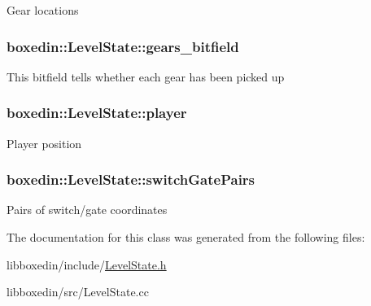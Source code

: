 Gear locations \hypertarget{classboxedin_1_1LevelState_afac5079af12178ae9c5aec7a753e21ad}{
\subsubsection[{gears\+\_\+bitfield}]{ boxedin\+::\+Level\+State\+::gears\+\_\+bitfield}}\label{classboxedin_1_1LevelState_afac5079af12178ae9c5aec7a753e21ad}
This bitfield tells whether each gear has been picked up \hypertarget{classboxedin_1_1LevelState_a1e04f0ad962384393c45d47242260fe6}{
\subsubsection[{player}]{ boxedin\+::\+Level\+State\+::player}}\label{classboxedin_1_1LevelState_a1e04f0ad962384393c45d47242260fe6}
Player position \hypertarget{classboxedin_1_1LevelState_a988fcdbba677903b2b7b893446473768}{
\subsubsection[{switch\+Gate\+Pairs}]{ boxedin\+::\+Level\+State\+::switch\+Gate\+Pairs\hspace{0.3cm}{\ttfamily [static]}}}\label{classboxedin_1_1LevelState_a988fcdbba677903b2b7b893446473768}
Pairs of switch/gate coordinates 

The documentation for this class was generated from the following files\+:\begin{DoxyCompactItemize}
\item 
libboxedin/include/\hyperlink{LevelState_8h}{Level\+State.\+h}\item 
libboxedin/src/Level\+State.\+cc\end{DoxyCompactItemize}
